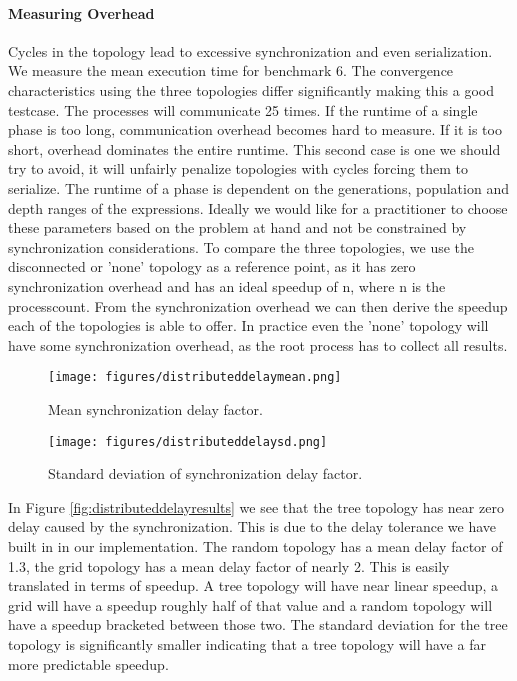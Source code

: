 \paragraph{Measuring Overhead}
Cycles in the topology lead to excessive synchronization and even serialization. We measure the mean execution time for benchmark 6. The convergence characteristics using the three topologies differ significantly making this a good testcase. The processes will communicate 25 times. If the runtime of a single phase is too long, communication overhead becomes hard to measure. If it is too short, overhead dominates the entire runtime. This second case is one we should try to avoid, it will unfairly penalize topologies with cycles forcing them to serialize. The runtime of a phase is dependent on the generations, population and depth ranges of the expressions. Ideally we would like for a practitioner to choose these parameters based on the problem at hand and not be constrained by synchronization considerations. To compare the three topologies, we use the disconnected or 'none' topology as a reference point, as it has zero synchronization overhead and has an ideal speedup of n, where n is the processcount. From the synchronization overhead we can then derive the speedup each of the topologies is able to offer. In practice even the 'none' topology will have some synchronization overhead, as the root process has to collect all results.
\begin{figure*}
    \centering
    \begin{subfigure}{0.5\textwidth}
    \centering
        \texttt{[image: figures/distributeddelaymean.png]}
        \caption{Mean synchronization delay factor.}
    \end{subfigure}%
    \begin{subfigure}{0.5\textwidth}
    \centering
        \texttt{[image: figures/distributeddelaysd.png]}
        \caption{Standard deviation of synchronization delay factor.}
    \end{subfigure}
    \caption{Synchronization overhead introduced by topologies.}
    \label{fig:distributeddelayresults}
    \end{figure*}
In Figure \ref{fig:distributeddelayresults} we see that the tree topology has near zero delay caused by the synchronization. This is due to the delay tolerance we have built in in our implementation. The random topology has a mean delay factor of 1.3, the grid topology  has a mean delay factor of nearly 2. This is easily translated in terms of speedup. A tree topology will have near linear speedup, a grid will have a speedup roughly half of that value and a random topology will have a speedup bracketed between those two. The standard deviation for the tree topology is significantly smaller indicating that a tree topology will have a far more predictable speedup.